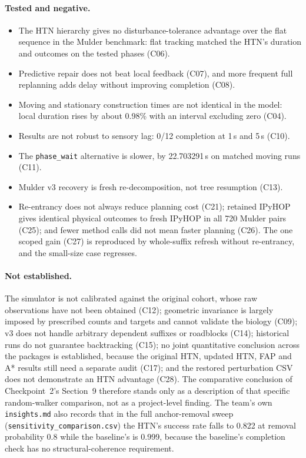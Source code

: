 \paragraph{Tested and negative.}
\begin{itemize}
  \item The HTN hierarchy gives no disturbance-tolerance advantage over the flat sequence in the Mulder benchmark:
    flat tracking matched the HTN's duration and outcomes on the tested phases (C06).
  \item Predictive repair does not beat local feedback (C07), and more frequent full replanning adds delay without
    improving completion (C08).
  \item Moving and stationary construction times are not identical in the model: local duration rises by about
    0.98\% with an interval excluding zero (C04).
  \item Results are not robust to sensory lag: 0/12 completion at 1\,s and 5\,s (C10).
  \item The \texttt{phase\_wait} alternative is slower, by 22.703291\,s on matched moving runs (C11).
  \item Mulder v3 recovery is fresh re-decomposition, not tree resumption (C13).
  \item Re-entrancy does not always reduce planning cost (C21); retained IPyHOP gives identical physical outcomes to
    fresh IPyHOP in all 720 Mulder pairs (C25); and fewer method calls did not mean faster planning (C26). The
    one scoped gain (C27) is reproduced by whole-suffix refresh without re-entrancy, and the small-size case regresses.
\end{itemize}

\paragraph{Not established.}
The simulator is not calibrated against the original cohort, whose raw observations have not been obtained (C12);
geometric invariance is largely imposed by prescribed counts and targets and cannot validate the biology (C09);
v3 does not handle arbitrary dependent suffixes or roadblocks (C14); historical runs do not guarantee backtracking
(C15); no joint quantitative conclusion across the packages is established, because the original HTN, updated HTN,
FAP and A* results still need a separate audit (C17); and the restored perturbation CSV does not demonstrate an HTN
advantage (C28). The comparative conclusion of Checkpoint~2's Section~9 therefore stands only as a description of
that specific random-walker comparison, not as a project-level finding. The team's own \texttt{insights.md} also
records that in the full anchor-removal sweep (\texttt{sensitivity\_\allowbreak{}comparison.csv}) the HTN's success rate falls to
0.822 at removal probability 0.8 while the baseline's is 0.999, because the baseline's completion check has no
structural-coherence requirement.

